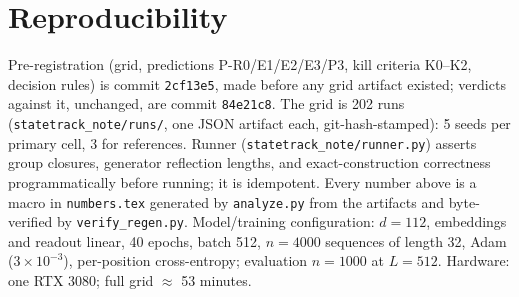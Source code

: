 \documentclass[10pt]{article}
\begin{document}
\section{Reproducibility}\label{app:repro}
Pre-registration (grid, predictions P-R0/E1/E2/E3/P3, kill criteria K0--K2, decision rules) is commit
\texttt{2cf13e5}, made before any grid artifact existed; verdicts against it, unchanged, are commit
\texttt{84e21c8}. The grid is 202 runs (\texttt{statetrack\_note/runs/}, one JSON artifact each,
git-hash-stamped): 5 seeds per primary cell, 3 for references. Runner
(\texttt{statetrack\_note/runner.py}) asserts group closures, generator reflection lengths, and
exact-construction correctness programmatically before running; it is idempotent. Every number above
is a macro in \texttt{numbers.tex} generated by \texttt{analyze.py} from the artifacts and
byte-verified by \texttt{verify\_regen.py}. Model/training configuration: $d{=}112$, embeddings and
readout linear, 40 epochs, batch 512, $n{=}4000$ sequences of length 32, Adam ($3{\times}10^{-3}$),
per-position cross-entropy; evaluation $n{=}1000$ at $L{=}512$. Hardware: one RTX 3080; full grid
$\approx$ 53 minutes.
\end{document}
